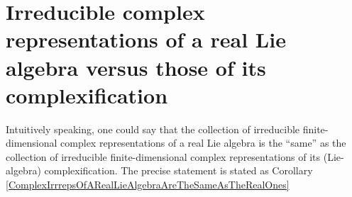 

\section{Irreducible complex representations of a real Lie algebra versus those of its complexification}
\setcounter{theorem}{0}
\setcounter{equation}{0}


\renewcommand{\theenumi}{\roman{enumi}}
\renewcommand{\labelenumi}{\textnormal{(\theenumi)}$\;\;$}


\vskip 0.3cm
\begin{remark}
\mbox{}
\vskip 0.05cm
\noindent
Intuitively speaking, one could say that
the collection of irreducible finite-dimensional {\color{red}complex representations} of a {\color{red}real Lie algebra}
is the ``same'' as
the collection of irreducible finite-dimensional complex representations of its (Lie-algebra) {\color{red}complexification}.
The precise statement is stated as
Corollary \ref{ComplexIrrrepsOfARealLieAlgebraAreTheSameAsTheRealOnes}
\end{remark}


